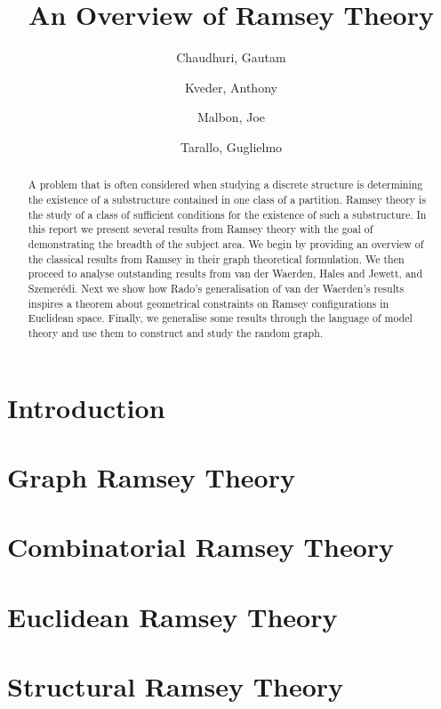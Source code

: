 \documentclass{article}
\title{An Overview of Ramsey Theory}
\author{
  Chaudhuri, Gautam\\
  \and
  Kveder, Anthony\\
  \and
  Malbon, Joe\\
  \and
  Tarallo, Guglielmo\\
}
\theoremstyle{BreakBold}
\theoremstyle{example}
\theoremstyle{definition}
\begin{document}
\begin{titlingpage}
\maketitle
\begin{abstract}
  A problem that is often considered when studying a discrete structure is
  determining the existence of a substructure contained in one class of a partition.
  Ramsey theory is the study of a class of sufficient conditions for the
  existence of such a substructure.
  In this report we present several results from Ramsey theory with the goal of
  demonstrating the breadth of the subject area.
  We begin by providing an overview of the classical results from Ramsey in
  their graph theoretical formulation.
  We then proceed to analyse outstanding results from van der Waerden, Hales
  and Jewett, and Szemerédi.
  Next we show how Rado's generalisation of van der Waerden's results inspires 
  a theorem about geometrical constraints on Ramsey configurations in Euclidean space.
  Finally, we generalise some results through the language of model theory and
  use them to construct and study the random graph.
\end{abstract}
\end{titlingpage}
\tableofcontents

\newpage
\section*{Introduction}\label{sec:0}


\newpage
\section{Graph Ramsey Theory}\label{sec:1}


\newpage
\section{Combinatorial Ramsey Theory}\label{sec:2}


\newpage
\section{Euclidean Ramsey Theory}\label{sec:3}


\newpage
\section{Structural Ramsey Theory}\label{sec:4}


\printbibliography{}
\end{document}
